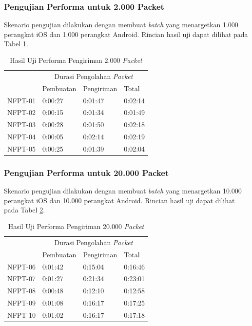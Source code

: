 \subsubsection{Pengujian Performa untuk 2.000 Packet}
\par Skenario pengujian dilakukan dengan membuat \textit{batch} yang menargetkan 1.000 perangkat iOS dan 1.000 perangkat Android. Rincian hasil uji dapat dilihat pada Tabel \ref{t:performa-2k}.
\clearpage
\begin{longtable}{|p{1.5cm}|p{2cm}|p{2cm}|p{2cm}|}
	\caption{Hasil Uji Performa Pengiriman 2.000 \textit{Packet}} \label{t:performa-2k} \\ \hline
	\rowcolor{lightgray} & \multicolumn{3}{c|}{Durasi Pengolahan \textit{Packet}} \\ \hhline{~|*3{-}|}
	\rowcolor{lightgray} \multirow{-2}{*}{Kode} & Pembuatan & Pengiriman & Total \\ \hline
	NFPT-01 & 0:00:27 & 0:01:47 & 0:02:14 \\ \hline 
	NFPT-02 & 0:00:15 & 0:01:34 & 0:01:49 \\ \hline
	NFPT-03 & 0:00:28 & 0:01:50 & 0:02:18 \\ \hline
	NFPT-04 & 0:00:05 & 0:02:14 & 0:02:19 \\ \hline
	NFPT-05 & 0:00:25 & 0:01:39 & 0:02:04 \\ \hline
\end{longtable}

\subsubsection{Pengujian Performa untuk 20.000 Packet}
\par Skenario pengujian dilakukan dengan membuat \textit{batch} yang menargetkan 10.000 perangkat iOS dan 10.000 perangkat Android. Rincian hasil uji dapat dilihat pada Tabel \ref{t:performa-20k}.
\begin{longtable}{|p{1.5cm}|p{2cm}|p{2cm}|p{2cm}|}
	\caption{Hasil Uji Performa Pengiriman 20.000 \textit{Packet}} \label{t:performa-20k} \\ \hline
	\rowcolor{lightgray} & \multicolumn{3}{c|}{Durasi Pengolahan \textit{Packet}} \\ \hhline{~|*3{-}|}
	\rowcolor{lightgray} \multirow{-2}{*}{Kode} & Pembuatan & Pengiriman & Total \\ \hline
	NFPT-06 & 0:01:42 & 0:15:04 & 0:16:46 \\ \hline 
	NFPT-07 & 0:01:27 & 0:21:34 & 0:23:01 \\ \hline
	NFPT-08 & 0:00:48 & 0:12:10 & 0:12:58 \\ \hline
	NFPT-09 & 0:01:08 & 0:16:17 & 0:17:25 \\ \hline
	NFPT-10 & 0:01:02 & 0:16:17 & 0:17:18 \\ \hline
\end{longtable}

